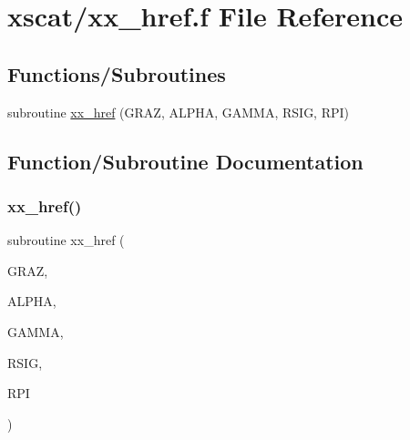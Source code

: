 \hypertarget{xx__href_8f}{}\section{xscat/xx\+\_\+href.f File Reference}
\label{xx__href_8f}
\subsection*{Functions/\+Subroutines}
\begin{DoxyCompactItemize}
\item 
subroutine \hyperlink{xx__href_8f_a7443febdc259711e8ffd3c26eb04a0fa}{xx\+\_\+href} (G\+R\+AZ, A\+L\+P\+HA, G\+A\+M\+MA, R\+S\+IG, R\+PI)
\end{DoxyCompactItemize}


\subsection{Function/\+Subroutine Documentation}
\mbox{\label{xx__href_8f_a7443febdc259711e8ffd3c26eb04a0fa}} 
\subsubsection{\texorpdfstring{xx\+\_\+href()}{xx\_href()}}
{\footnotesize\ttfamily subroutine xx\+\_\+href (\begin{DoxyParamCaption}\item[{}]{G\+R\+AZ,  }\item[{}]{A\+L\+P\+HA,  }\item[{}]{G\+A\+M\+MA,  }\item[{}]{R\+S\+IG,  }\item[{}]{R\+PI }\end{DoxyParamCaption})}

